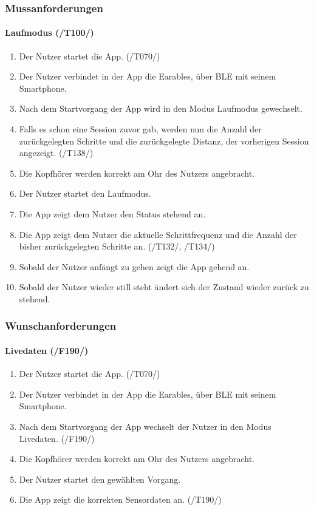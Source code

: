 \documentclass[a4paper,12pt]{article}
\begin{document}
    \subsubsection{Mussanforderungen}
      \paragraph{Laufmodus (/T100/)}
      \begin{enumerate}
        \item Der Nutzer startet die App. (/T070/)
        \item Der Nutzer verbindet in der App die \gls{Earables}, über \gls{BLE} mit seinem Smartphone.
        \item Nach dem Startvorgang der App wird in den Modus \glqq Laufmodus\grqq{} gewechselt.
        \item Falls es schon eine Session zuvor gab, werden nun die Anzahl der zurückgelegten Schritte und die zurückgelegte Distanz, der vorherigen Session angezeigt. (/T138/)
        \item Die Kopfhörer werden korrekt am Ohr des Nutzers angebracht.
        \item Der Nutzer startet den Laufmodus.
        \item Die App zeigt dem Nutzer den Status \glqq stehend\grqq{} an.
        \item Die App zeigt dem Nutzer die aktuelle \gls{Schrittfrequenz} und die Anzahl der bisher zurückgelegten Schritte an. (/T132/, /T134/)
        \item Sobald der Nutzer anfängt zu gehen zeigt die App \glqq gehend\grqq{} an.
        \item Sobald der Nutzer wieder still steht ändert sich der Zustand wieder zurück zu \glqq stehend\grqq. 
      \end{enumerate}

    \subsubsection{Wunschanforderungen}
        
    \paragraph{Livedaten (/F190/)}%
      \begin{enumerate}
        \item Der Nutzer startet die App. (/T070/)
        \item Der Nutzer verbindet in der App die \gls{Earables}, über \gls{BLE} mit seinem Smartphone.
        \item Nach dem Startvorgang der App wechselt der Nutzer in den Modus \glqq Livedaten\grqq . (/F190/)
        \item Die Kopfhörer werden korrekt am Ohr des Nutzers angebracht.
        \item Der Nutzer startet den gewählten \Gls{Vorgang}.
        \item Die App zeigt die korrekten Sensordaten an. (/T190/)
      \end{enumerate}
\end{document}
